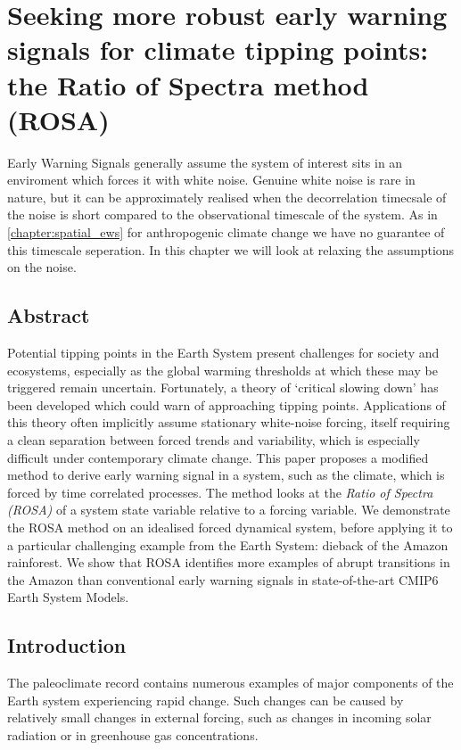 \chapter{Seeking more robust early warning signals for climate tipping points: the Ratio of Spectra method (ROSA)}
\label{chapter:rosa}
\graphicspath{{ROSA/figs}}

Early Warning Signals generally assume the system of interest sits in an enviroment which forces it with white noise.
Genuine white noise is rare in nature, but it can be approximately realised when the decorrelation timecsale of the noise
is short compared to the observational timescale of the system. As in \cref{chapter:spatial_ews} for anthropogenic climate
change we have no guarantee of this timescale seperation. In this chapter we will look at relaxing the assumptions on the noise.

\section{Abstract}
Potential tipping points in the Earth System present challenges for society and 
ecosystems, especially as the global warming thresholds at which these may be triggered remain uncertain. 
Fortunately, a theory of `critical slowing down' has been developed which could warn of approaching tipping points. 
Applications of this theory often implicitly assume stationary white-noise forcing,  itself requiring a clean separation
between forced trends and variability, which is especially difficult under contemporary climate change. 
This paper proposes a modified method to derive early warning signal in a 
system, such as the climate, which is forced by time correlated processes. 
The method looks at the \emph{Ratio of Spectra (ROSA)} of a system state variable relative to a forcing variable.   
We demonstrate the ROSA method on an idealised forced dynamical system, before applying it 
to a particular challenging example from the Earth System: dieback of the Amazon rainforest.
We show that ROSA identifies more examples of abrupt transitions in the Amazon than conventional early warning signals in state-of-the-art CMIP6 Earth System Models.


\section{Introduction}\label{sec:introduction}
The paleoclimate record contains numerous examples\cite{Brovkin2021} of 
major components of the Earth system experiencing rapid 
change. Such changes can be caused by 
relatively small changes in external forcing, such as changes in incoming
solar radiation or in greenhouse gas concentrations.


